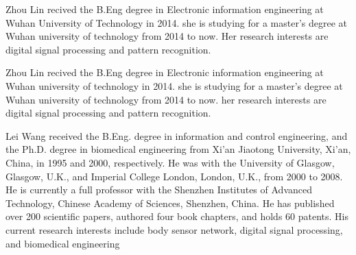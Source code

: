 \documentclass[journal]{IEEEtran}
\begin{document}
\begin{IEEEbiography}[]{Zhou Lin}
recived the B.Eng degree in Electronic information engineering at Wuhan University of Technology in 2014. she is studying for a master's degree at Wuhan university of technology from 2014 to now. Her research interests are digital signal processing and pattern recognition.
\end{IEEEbiography}

\begin{IEEEbiography}[]{Zhou Lin}
recived the B.Eng degree in Electronic information engineering at Wuhan university of technology in 2014. she is studying for a master's degree at Wuhan university of technology from 2014 to now. her research interests are digital signal processing and pattern recognition.
\end{IEEEbiography}

\begin{IEEEbiography}{Lei Wang}
received the B.Eng. degree in information and control engineering, and the Ph.D. degree in biomedical engineering from Xi’an Jiaotong University, Xi’an, China, in 1995 and 2000, respectively. He was with the University of Glasgow, Glasgow, U.K., and Imperial College London, London, U.K., from 2000 to 2008. He is currently a full professor with the Shenzhen Institutes of Advanced Technology, Chinese Academy of Sciences, Shenzhen, China. He has published over 200 scientific papers, authored four book chapters, and holds 60 patents. His current research interests include body sensor network, digital signal processing, and biomedical engineering
\end{IEEEbiography}








\end{document}

